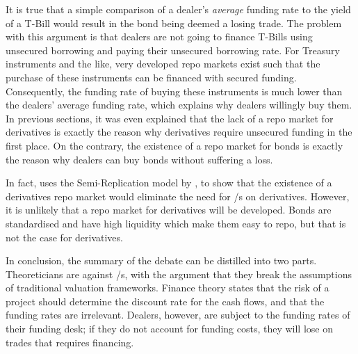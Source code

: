\documentclass[main.tex]{subfiles}
\begin{document}
            It is true that a simple comparison of a dealer's \textit{average} funding rate
            to the yield of a T-Bill would result in the bond being deemed a losing trade.
            The problem with this argument is that dealers are not going to finance T-Bills
            using unsecured borrowing and paying their unsecured borrowing rate.
            For Treasury instruments and the like,
            very developed repo markets exist such that 
            the purchase of these instruments can be financed with secured funding.
            Consequently, the funding rate of buying these instruments is much lower 
            than the dealers' average funding rate,
            which explains why dealers willingly buy them.
            In previous sections, it was even explained that
            the lack of a repo market for derivatives is exactly the reason 
            why derivatives require unsecured funding in the first place.
            On the contrary, the existence of a repo market for bonds is exactly the reason
            why dealers can buy bonds without suffering a loss.

            In fact, \textcite{Green2015XVA}
            uses the Semi-Replication model by \textcite{BurgardKjaer2013Funding},
            to show that the existence of a derivatives repo market
            would eliminate the need for \FVA/s on derivatives. 
            However, it is unlikely that a repo market for derivatives will be developed.
            Bonds are standardised and have high liquidity which make them easy to repo,
            but that is not the case for derivatives.

        In conclusion, the summary of the debate can be distilled into two parts.
        Theoreticians are against \FVA/s, 
        with the argument that they break the assumptions of traditional valuation frameworks.
        Finance theory states that the risk of a project 
        should determine the discount rate for the cash flows, 
        and that the funding rates are irrelevant.
        Dealers, however, are subject to the funding rates of their funding desk;
        if they do not account for funding costs, they will lose on trades that requires financing.
\end{document}
